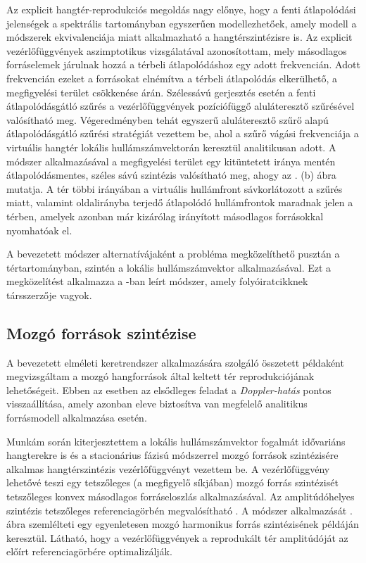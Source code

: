 \documentclass[10pt,twoside]{article}
\theoremstyle{thesisgroupstyle}
\theoremstyle{indented}
\begin{document}
Az explicit hangtér-reprodukciós megoldás nagy előnye, hogy a fenti átlapolódási jelenségek a spektrális tartományban egyszerűen modellezhetőek, amely modell a módszerek ekvivalenciája miatt alkalmazható a hangtérszintézisre is.
Az explicit vezérlőfüggvények aszimptotikus vizsgálatával azonosítottam, mely másodlagos forráselemek járulnak hozzá a térbeli átlapolódáshoz egy adott frekvencián.
Adott frekvencián ezeket a forrásokat elnémítva a térbeli átlapolódás elkerülhető, a megfigyelési terület csökkenése árán.
Szélessávú gerjesztés esetén a fenti átlapolódásgátló szűrés a vezérlőfüggvények pozíciófüggő aluláteresztő szűrésével valósítható meg.
Végeredményben tehát egyszerű aluláteresztő szűrő alapú átlapolódásgátló szűrési stratégiát vezettem be, ahol a szűrő vágási frekvenciája a virtuális hangtér lokális hullámszámvektorán keresztül analitikusan adott.
A módszer alkalmazásával a megfigyelési terület egy kitüntetett iránya mentén átlapolódásmentes, széles sávú szintézis valósítható meg, ahogy az . (b) ábra mutatja.
A tér többi irányában a virtuális hullámfront sávkorlátozott a szűrés miatt, valamint oldalirányba terjedő átlapolódó hullámfrontok maradnak jelen a térben, amelyek azonban már kizárólag irányított másodlagos forrásokkal nyomhatóak el.

A bevezetett módszer alternatívájaként a probléma megközelíthető pusztán a tértartományban, szintén a lokális hullámszámvektor alkalmazásával.
Ezt a megközelítést alkalmazza a \cite{8611109_booklet}-ban leírt módszer, amely folyóiratcikknek társszerzője vagyok.

\subsection{Mozgó források szintézise}

A bevezetett elméleti keretrendszer alkalmazására szolgáló összetett példaként megvizsgáltam a mozgó hangforrások által keltett tér reprodukciójának lehetőségeit.
Ebben az esetben az elsődleges feladat a \emph{Doppler-hatás} pontos visszaállítása, amely azonban eleve biztosítva van megfelelő analitikus forrásmodell alkalmazása esetén.

Munkám során kiterjesztettem a lokális hullámszámvektor fogalmát idővariáns hangterekre is és a stacionárius fázisú módszerrel mozgó források szintézisére alkalmas hangtérszintézis vezérlőfüggvényt vezettem be.
A vezérlőfüggvény lehetővé teszi egy tetszőleges (a megfigyelő síkjában) mozgó forrás szintézisét tetszőleges konvex másodlagos forráseloszlás alkalmazásával. 
Az amplitúdóhelyes szintézis tetszőleges referenciagörbén megvalósítható \cite{firtha2016wave_booklet, doi:10.1121/1.4996126_booklet, Firtha2015:daga_booklet}.
A módszer alkalmazását . ábra szemlélteti egy egyenletesen mozgó harmonikus forrás szintézisének példáján keresztül.
Látható, hogy a vezérlőfüggvények a reprodukált tér amplitúdóját az előírt referenciagörbére optimalizálják. 
\end{document}
